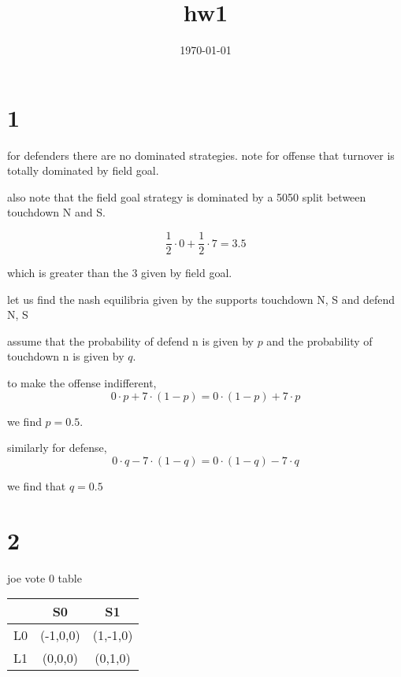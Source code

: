 \documentclass{article}
\title{hw1}
\date{\today}
\begin{document}
\maketitle

\section{1}

for defenders there are no dominated strategies.
note for offense that turnover is totally dominated by field goal. 

also note that the field goal strategy is dominated by a 5050 split between touchdown N and S. 

\begin{equation}
    \frac{1}{2}\cdot 0+\frac{1}{2}\cdot 7 = 3.5
\end{equation}

which is greater than the 3 given by field goal. 

let us find the nash equilibria given by the supports touchdown N, S and defend N, S

assume that the probability of defend n is given by \(p\) and the probability of touchdown n is given by \(q\). 

to make the offense indifferent, 
\begin{equation}
    0\cdot p + 7\cdot (1-p) = 0\cdot (1-p)  + 7\cdot p 
\end{equation}

we find \(p=0.5\). 

similarly for defense, 
\begin{equation}
    0\cdot q - 7\cdot (1-q) = 0\cdot (1-q)  - 7\cdot q 
\end{equation}

we find that \(q=0.5\) 
\newpage
\section{2}

joe vote 0 table
\begin{table}[h!]
\centering
\begin{tabular}{c|c c}
\toprule
 & S0 & S1 \\
\midrule
L0 & (-1,0,0) & (1,-1,0) \\
L1 & (0,0,0) & (0,1,0) \\
\bottomrule
\end{tabular}

\end{table}
\end{document}
